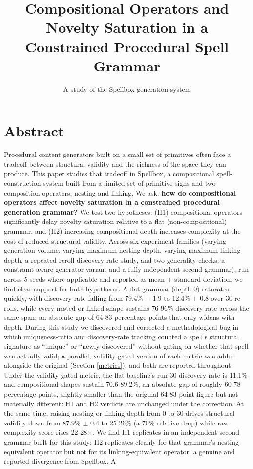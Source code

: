 \documentclass[]{article}
\title{\textbf{Compositional Operators and Novelty Saturation in a Constrained Procedural Spell Grammar}}
\subtitle{A study of the Spellbox generation system}
\date{}
\author{}
\date{}
\author{}
\begin{document}

    \twocolumn[\maketitle]

    \section*{Abstract}\label{abstract}

    Procedural content generators built on a small set of primitives often face a tradeoff between structural validity and the richness of the space they can produce. This paper studies that tradeoff in Spellbox, a compositional spell-construction system built from a limited set of primitive signs and two composition operators, nesting and linking. We ask: \textbf{how do compositional operators affect novelty saturation in a constrained procedural generation grammar?} We test two hypotheses: (H1) compositional operators significantly delay novelty saturation relative to a flat (non-compositional) grammar, and (H2) increasing compositional depth increases complexity at the cost of reduced structural validity. Across six experiment families (varying generation volume, varying maximum nesting depth, varying maximum linking depth, a repeated-reroll discovery-rate study, and two generality checks: a constraint-aware generator variant and a fully independent second grammar), run across 5 seeds where applicable and reported as mean $\pm$ standard deviation, we find clear support for both hypotheses. A flat grammar (depth 0) saturates quickly, with discovery rate falling from 79.4\% $\pm$ 1.9 to 12.4\% $\pm$ 0.8 over 30 re-rolls, while every nested or linked shape sustains 76-96\% discovery rate across the same span: an absolute gap of 64-83 percentage points that only widens with depth. During this study we discovered and corrected a methodological bug in which uniqueness-ratio and discovery-rate tracking counted a spell's structural signature as ``unique'' or ``newly discovered'' without gating on whether that spell was actually valid; a parallel, validity-gated version of each metric was added alongside the original (Section \ref{metrics}), and both are reported throughout. Under the validity-gated metric, the flat baseline's run-30 discovery rate is 11.1\% and compositional shapes sustain 70.6-89.2\%, an absolute gap of roughly 60-78 percentage points, slightly smaller than the original 64-83 point figure but not materially different: H1 and H2 verdicts are unchanged under the correction. At the same time, raising nesting or linking depth from 0 to 30 drives structural validity down from 87.9\% $\pm$ 0.4 to 25-26\% (a 70\% relative drop) while raw complexity score rises 22-28×. We find H1 replicates in an independent second grammar built for this study; H2 replicates cleanly for that grammar's nesting-equivalent operator but not for its linking-equivalent operator, a genuine and reported divergence from Spellbox. A 
\end{document}
